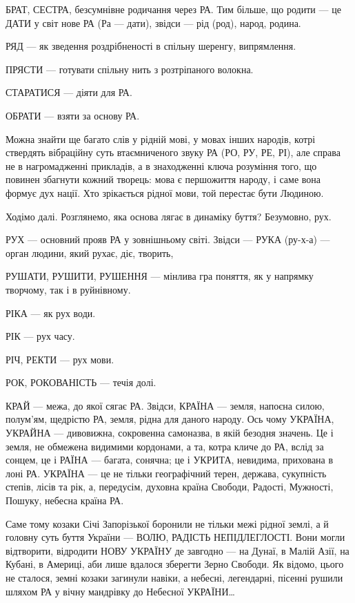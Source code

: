 БРАТ, СЕСТРА, безсумнівне родичання через РА. Тим більше, що родити — це ДАТИ у
світ нове РА (Ра — дати), звідси — рід (род), народ, родина.

РЯД — як зведення роздрібненості в спільну шеренгу, випрямлення.

ПРЯСТИ — готувати спільну нить з розтріпаного волокна.

СТАРАТИСЯ — діяти для РА.

ОБРАТИ — взяти за основу РА.

Можна знайти ще багато слів у рідній мові, у мовах інших народів, котрі
ствердять вібраційну суть втаємниченого звуку РА (РО, РУ, РЕ, РІ), але справа
не в нагромадженні прикладів, а в знаходженні ключа розуміння того, що повинен
збагнути кожний творець: мова є першожиття народу, і саме вона формує дух
нації. Хто зрікається рідної мови, той перестає бути Людиною.

Ходімо далі. Розглянемо, яка основа лягає в динаміку буття? Безумовно, рух.

РУХ — основний прояв РА у зовнішньому світі. Звідси — РУКА (ру-х-а) — орган
людини, який рухає, діє, творить,

РУШАТИ, РУШИТИ, РУШЕННЯ — мінлива гра поняття, як у напрямку творчому, так і в
руйнівному.

РІКА — як рух води.

РІК — рух часу.

РІЧ, РЕКТИ — рух мови.

РОК, РОКОВАНІСТЬ — течія долі.

КРАЙ — межа, до якої сягає РА. Звідси, КРАЇНА — земля, напоєна силою, полум’ям,
щедрістю РА, земля, рідна для даного народу. Ось чому УКРАЇНА, УКРАЙНА —
дивовижна, сокровенна самоназва, в якій безодня значень. Це і земля, не
обмежена видимими кордонами, а та, котра кличе до РА, вслід за сонцем, це і
РАЇНА — багата, сонячна; це і УКРИТА, невидима, прихована в лоні РА. УКРАЇНА —
це не тільки географічний терен, держава, сукупність степів, лісів та рік, а,
передусім, духовна країна Свободи, Радості, Мужності, Пошуку, небесна країна
РА.

Саме тому козаки Січі Запорізької боронили не тільки межі рідної землі, а й
головну суть буття України — ВОЛЮ, РАДІСТЬ НЕПІДЛЕГЛОСТІ. Вони могли
відтворити, відродити НОВУ УКРАЇНУ де завгодно — на Дунаї, в Малій Азії, на
Кубані, в Америці, аби лише вдалося зберегти Зерно Свободи. Як відомо, цього не
сталося, земні козаки загинули навіки, а небесні, легендарні, пісенні рушили
шляхом РА у вічну мандрівку до Небесної УКРАЇНИ…

